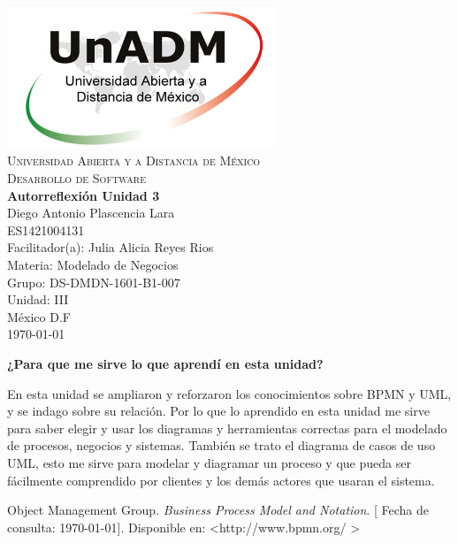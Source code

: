 \documentclass[spanish,12pt,letterpapper]{article}
\begin{document}
	\begin{titlepage}
		\begin{center}
			\includegraphics[width=0.6\textwidth]{../logoUnADM}~\\[1cm] 
			\textsc{Universidad Abierta y a Distancia de México}\\[0.8cm]
			\textsc{Desarrollo de Software}\\[1.8cm]
			
			\textbf{ \Large Autorreflexión Unidad 3}\\[3cm]
			
			Diego Antonio Plascencia Lara\\ ES1421004131 \\[0.4cm]
			Facilitador(a): Julia Alicia Reyes Rios\\
			Materia: Modelado de Negocios\\
			Grupo: DS-DMDN-1601-B1-007 \\
			Unidad: III \\
			
			\vfill México D.F\\{\today}
			
		\end{center}
	\end{titlepage}
	
	\textbf{¿Para que me sirve lo que aprendí en esta unidad?\\}
	
	En esta unidad se ampliaron y reforzaron los conocimientos sobre BPMN y UML, y se indago sobre su relación. Por lo que lo aprendido en esta unidad me sirve para saber elegir y usar los diagramas y herramientas correctas para el modelado de procesos, negocios y sistemas. También se trato el diagrama de casos de uso UML, esto me sirve para modelar y diagramar un proceso y que pueda ser fácilmente comprendido por clientes y los demás actores que usaran el sistema.
	
	
	\pagebreak
	\begin{thebibliography}{9}
	 Object Management Group. 
		\emph{Business Process Model and Notation}. {[} Fecha de consulta: \today {]}. Disponible en: \textless http://www.bpmn.org/ \textgreater	
	\end{thebibliography}
\end{document}
